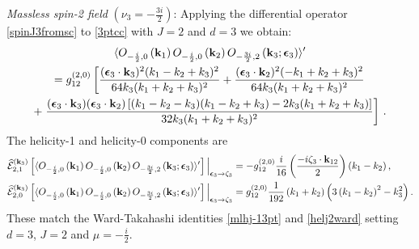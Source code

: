 \documentclass[11pt,a4paper]{article}
\begin{document}
\emph{Massless spin-2 field} $(\nu_3=-\frac{3i}{2})$:
Applying the differential operator \eqref{spinJ3fromsc} to \eqref{3ptcc} with $J=2$ and $d=3$ we obtain:
\begin{multline}\label{d3ml2}
    \langle O_{-\frac{i}{2},0}\left({\bf k}_1\right)O_{-\frac{i}{2},0}\left({\bf k}_2\right)O_{-\frac{3i}{2},2}\left({\bf k}_3;\boldsymbol{\epsilon}_3\right)  \rangle^\prime\\=g^{\left(2,0\right)}_{12}\left[\frac{(\boldsymbol{\epsilon}_3\cdot {\bf k}_3)^2 (k_1-k_2+k_3)^2}{64 k_3 (k_1+k_2+k_3)^2}+\frac{(\boldsymbol{\epsilon}_3\cdot {\bf k}_2)^2 (-k_1+k_2+k_3)^2}{64 k_3 (k_1+k_2+k_3)^2}\right.\\+\left.\frac{(\boldsymbol{\epsilon}_3\cdot {\bf k}_3) (\boldsymbol{\epsilon}_3\cdot {\bf k}_2) \left[(k_1-k_2-k_3) (k_1-k_2+k_3)-2 k_3 (k_1+k_2+k_3)\right]}{32 k_3 (k_1+k_2+k_3)^2}\right]\,.
\end{multline}
The helicity-1 and helicity-0 components are 
\begin{subequations}
\begin{align}
    \widehat{\mathcal{E}}^{({\bf k}_3)}_{2,1}\left[\langle O_{-\frac{i}{2},0}\left({\bf k}_1\right)O_{-\frac{i}{2},0}\left({\bf k}_2\right)O_{-\frac{3i}{2},2}\left({\bf k}_3;\boldsymbol{\epsilon}_3\right)  \rangle^\prime\right]\Big|_{\boldsymbol{\epsilon}_3 \to \zeta_3} &=  -g^{\left(2,0\right)}_{12}\frac{i}{16} \left(\frac{-i\zeta_3 \cdot {\bf k}_{12}}{2}\right) \left(k_1-k_2\right),\\
     \widehat{\mathcal{E}}^{({\bf k}_3)}_{2,0}\left[\langle O_{-\frac{i}{2},0}\left({\bf k}_1\right)O_{-\frac{i}{2},0}\left({\bf k}_2\right)O_{-\frac{3i}{2},2}\left({\bf k}_3;\boldsymbol{\epsilon}_3\right)  \rangle^\prime\right]\Big|_{\boldsymbol{\epsilon}_3 \to \zeta_3} &=  g^{\left(2,0\right)}_{12}\frac{1}{192} \left(k_1+k_2\right) \left(3 \left(k_1-k_2\right)^2-k_3^2\right).
\end{align}
\end{subequations}
These match the Ward-Takahashi identities \eqref{mlhj-13pt} and \eqref{helj2ward} setting $d=3$, $J=2$ and $\mu = -\tfrac{i}{2}$.\\
\end{document}
